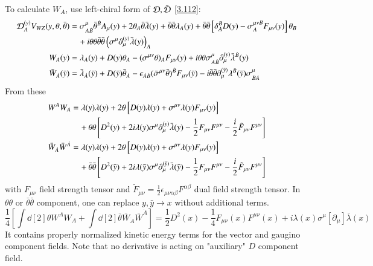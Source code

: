 To calculate $W_A$, use left-chiral form of $\mathcal{D}, \bar {\mathcal{D}}$ \eqref{3.112}:
\begin{subequations}
   \label{3.132}
\begin{align}
   \mathcal{D}_A^{(y)} V_{WZ} (y, \theta, \bar\theta) &= \sigma^\mu_{A\dot{B}} \bar\theta^{\dot{B}} A_\mu (y) + 2 \theta_A \bar\theta \bar\lambda(y) + \bar\theta \bar\theta \lambda_A(y) + \bar\theta \bar\theta \left[ \delta_A^B D(y) - \sigma^{\mu\nu B}_A F_{\mu\nu}(y) \right] \theta_B \notag \\ 
                                             &\quad + i \theta \theta \bar\theta \bar\theta \left(\sigma^\mu \partial_\mu^{(y)} \bar\lambda(y)\right)_A \label{3.132a} \\
   W_A (y) &= \lambda_A (y) + D(y) \theta_A - (\sigma^{\mu\nu} \theta)_A F_{\mu\nu}(y) + i\theta \theta \sigma^\mu_{A\dot{B}} \partial_\mu^{(y)} \bar\lambda^{\dot{B}} (y) \label{3.132b} \\
   \bar W_{\dot{A}} (\bar y) &= \bar\lambda_{\dot{A}} (\bar y) + D(\bar y) \bar \theta _{\dot{A}} - \epsilon_{\dot{A}\dot{B}} (\bar\sigma^{\mu\nu}\bar\theta)^{\dot{B}} F_{\mu\nu}(\bar y) - i \bar\theta \bar\theta \partial_\mu^{(\bar y)} \lambda^B (\bar y) \sigma^\mu_{B \dot{A}} \label{3.132c}
\end{align}
\end{subequations}
From these
\begin{subequations}
   \label{3.133}
\begin{align}
   W^A W_A &= \lambda(y) \lambda(y) + 2 \theta \left[ D(y) \lambda(y) + \sigma^{\mu\nu} \lambda(y) F_{\mu\nu}(y) \right] \notag \\ 
           & \quad + \theta \theta \left[ D^2(y) + 2i \lambda(y) \sigma^\mu \partial_\mu^{(y)} \bar\lambda(y) - \frac{1}{2} F_{\mu\nu} F^{\mu\nu} - \frac{i}{2} \tilde F_{\mu\nu} F^{\mu\nu} \right] \label{3.133a} \\
   \bar W_{\dot{A}} \bar W^{\dot{A}} &=  \lambda(y) \lambda(y) + 2 \theta \left[ D(y) \lambda(y) + \sigma^{\mu\nu} \lambda(y) F_{\mu\nu}(y) \right] \notag \\
                                     &\quad + \bar\theta \bar\theta \left[ D^2(\bar y) + 2i \lambda(\bar y) \sigma^\mu \partial_\mu^{(\bar y)} \bar\lambda(\bar y) - \frac{1}{2} F_{\mu\nu} F^{\mu\nu} - \frac{i}{2} \tilde F_{\mu\nu} F^{\mu\nu} \right] \label{3.133b}
\end{align}
\end{subequations}
with $F_{\mu\nu}$ field strength tensor and $\tilde F_{\mu\nu} = \frac{1}{2} \epsilon_{\mu\nu\alpha \beta} F^{\alpha \beta}$ dual field strength tensor. In $\theta\theta$ or $\bar\theta \bar\theta$ component, one can replace $y,\bar y \rightarrow x$ without additional terms.
\begin{equation}
   \frac{1}{4} \left[ \int \dd[2]{\theta W^A W_A} + \int \dd[2]{\bar\theta} \bar W_{\dot{A}} \bar W^{\dot{A}} \right] = \frac{1}{2} D^2 (x) - \frac{1}{4} F_{\mu\nu} (x) F^{\mu\nu} (x) + i\lambda(x) \sigma^\mu [\partial_\mu] \bar\lambda(x) \label{3.134}
\end{equation}
It contains properly normalized kinetic energy terms for the vector and gaugino component fields. Note that no derivative is acting on "auxiliary" $D$ component field.

